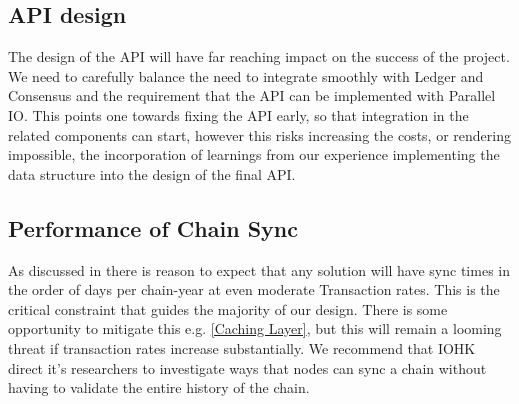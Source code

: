 \documentclass[11pt,a4paper]{article}
\begin{document}
\subsection{API design}
The design of the API will have far reaching impact on the success of the
project. We need to carefully balance the need to integrate smoothly with Ledger
and Consensus and the requirement that the API can be implemented with Parallel
IO. This points one towards fixing the API early, so that integration in the
related components can start, however this risks increasing the costs, or
rendering impossible, the incorporation of learnings from our experience
implementing the data structure into the design of the final API.

\subsection{Performance of Chain Sync}
As discussed in  there is reason to expect that any solution
will have sync times in the order of days per chain-year at even moderate
Transaction rates. This is the critical constraint that guides the majority of
our design. There is some opportunity to mitigate this e.g. \ref{Caching Layer},
but this will remain a looming threat if transaction rates increase
substantially. We recommend that IOHK direct it's researchers to investigate
ways that nodes can sync a chain without having to validate the entire history
of the chain.



\end{document}
